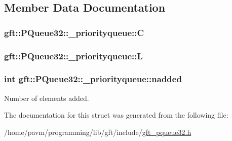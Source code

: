\subsection{Member Data Documentation}
\hypertarget{structgft_1_1PQueue32_1_1__priorityqueue_a6d54b970bf65337bb5b50b9e93b8af2c}{
\subsubsection[{C}]{ gft\-::\-P\-Queue32\-::\-\_\-priorityqueue\-::\-C}}\label{structgft_1_1PQueue32_1_1__priorityqueue_a6d54b970bf65337bb5b50b9e93b8af2c}
\hypertarget{structgft_1_1PQueue32_1_1__priorityqueue_a52881ee4fa383a2c8a237ebdc03a4c21}{
\subsubsection[{L}]{ gft\-::\-P\-Queue32\-::\-\_\-priorityqueue\-::\-L}}\label{structgft_1_1PQueue32_1_1__priorityqueue_a52881ee4fa383a2c8a237ebdc03a4c21}
\hypertarget{structgft_1_1PQueue32_1_1__priorityqueue_af5c8ac0e0628e1ebf95693aa7e2a40a3}{
\subsubsection[{nadded}]{\setlength{\rightskip}{0pt plus 5cm}int gft\-::\-P\-Queue32\-::\-\_\-priorityqueue\-::nadded}}\label{structgft_1_1PQueue32_1_1__priorityqueue_af5c8ac0e0628e1ebf95693aa7e2a40a3}


Number of elements added. 



The documentation for this struct was generated from the following file\-:\begin{DoxyCompactItemize}
\item 
/home/pavm/programming/lib/gft/include/\hyperlink{gft__pqueue32_8h}{gft\-\_\-pqueue32.\-h}\end{DoxyCompactItemize}
